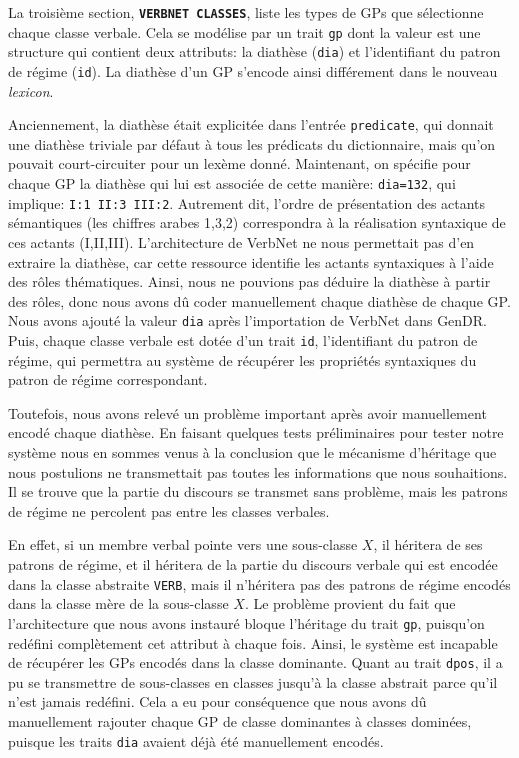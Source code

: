 La troisième section, \textbf{\texttt{VERBNET CLASSES}}, liste les types de \acp{GP} que sélectionne chaque classe verbale. Cela se modélise par un trait \texttt{gp} dont la valeur est une structure qui contient deux attributs: la diathèse (\texttt{dia}) et l'identifiant du patron de régime (\texttt{id}). La diathèse d'un \ac{GP} s'encode ainsi différement dans le nouveau \emph{lexicon}. 

Anciennement, la diathèse était explicitée dans l'entrée \texttt{predicate}, qui donnait une diathèse triviale par défaut à tous les prédicats du dictionnaire, mais qu'on pouvait court-circuiter pour un lexème donné. Maintenant, on spécifie pour chaque \ac{GP} la diathèse qui lui est associée de cette manière: \texttt{dia=132}, qui implique: \texttt{I:1 II:3 III:2}. Autrement dit, l'ordre de présentation des actants sémantiques (les chiffres arabes 1,3,2) correspondra à la réalisation syntaxique de ces actants (I,II,III). L'architecture de VerbNet ne nous permettait pas d'en extraire la diathèse, car cette ressource identifie les actants syntaxiques à l'aide des rôles thématiques. Ainsi, nous ne pouvions pas déduire la diathèse à partir des rôles, donc nous avons dû coder manuellement chaque diathèse de chaque \ac{GP}. Nous avons ajouté la valeur \texttt{dia} après l'importation de VerbNet dans GenDR. Puis, chaque classe verbale est dotée d'un trait \texttt{id}, l'identifiant du patron de régime, qui permettra au système de récupérer les propriétés syntaxiques du patron de régime correspondant.

Toutefois, nous avons relevé un problème important après avoir manuellement encodé chaque diathèse. En faisant quelques tests préliminaires pour tester notre système nous en sommes venus à la conclusion que le mécanisme d'héritage que nous postulions ne transmettait pas toutes les informations que nous souhaitions. Il se trouve que la partie du discours se transmet sans problème, mais les patrons de régime ne percolent pas entre les classes verbales. 

En effet, si un membre verbal pointe vers une sous-classe $X$, il héritera de ses patrons de régime, et il héritera de la partie du discours verbale qui est encodée dans la classe abstraite \texttt{VERB}, mais il n'héritera pas des patrons de régime encodés dans la classe mère de la sous-classe $X$. Le problème provient du fait que l'architecture que nous avons instauré bloque l'héritage du trait \texttt{gp}, puisqu'on redéfini complètement cet attribut à chaque fois. Ainsi, le système est incapable de récupérer les \acp{GP} encodés dans la classe dominante. Quant au trait \texttt{dpos}, il a pu se transmettre de sous-classes en classes jusqu'à la classe abstrait parce qu'il n'est jamais redéfini. Cela a eu pour conséquence que nous avons dû manuellement rajouter chaque \ac{GP} de classe dominantes à classes dominées, puisque les traits \texttt{dia} avaient déjà été manuellement encodés. 

